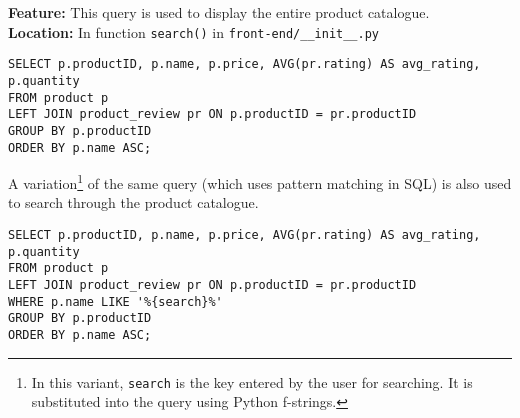 \textbf{Feature:} This query is used to display the entire product catalogue. \\
\textbf{Location:} In function \texttt{search()} in \texttt{front-end/\_\_init\_\_.py}

\begin{lstlisting}
SELECT p.productID, p.name, p.price, AVG(pr.rating) AS avg_rating, p.quantity
FROM product p
LEFT JOIN product_review pr ON p.productID = pr.productID
GROUP BY p.productID
ORDER BY p.name ASC;
\end{lstlisting}

A variation\footnote{
    In this variant, \texttt{search} is the key entered by the user for searching.
    It is substituted into the query using Python f-strings.
}  of the same query (which uses pattern matching in SQL) is also used to search through the product catalogue.

\begin{lstlisting}
SELECT p.productID, p.name, p.price, AVG(pr.rating) AS avg_rating, p.quantity
FROM product p
LEFT JOIN product_review pr ON p.productID = pr.productID
WHERE p.name LIKE '%{search}%'
GROUP BY p.productID
ORDER BY p.name ASC;
\end{lstlisting}